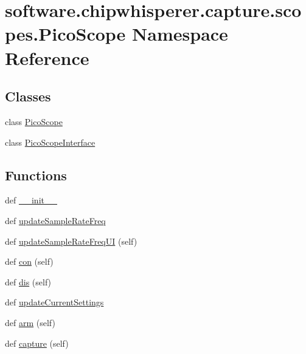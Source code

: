 \hypertarget{namespacesoftware_1_1chipwhisperer_1_1capture_1_1scopes_1_1PicoScope}{}\section{software.\+chipwhisperer.\+capture.\+scopes.\+Pico\+Scope Namespace Reference}
\label{namespacesoftware_1_1chipwhisperer_1_1capture_1_1scopes_1_1PicoScope}
\subsection*{Classes}
\begin{DoxyCompactItemize}
\item 
class \hyperlink{classsoftware_1_1chipwhisperer_1_1capture_1_1scopes_1_1PicoScope_1_1PicoScope}{Pico\+Scope}
\item 
class \hyperlink{classsoftware_1_1chipwhisperer_1_1capture_1_1scopes_1_1PicoScope_1_1PicoScopeInterface}{Pico\+Scope\+Interface}
\end{DoxyCompactItemize}
\subsection*{Functions}
\begin{DoxyCompactItemize}
\item 
def \hyperlink{namespacesoftware_1_1chipwhisperer_1_1capture_1_1scopes_1_1PicoScope_aede6bc8094789e7a9abfcfee603d9b4b}{\+\_\+\+\_\+init\+\_\+\+\_\+}
\item 
def \hyperlink{namespacesoftware_1_1chipwhisperer_1_1capture_1_1scopes_1_1PicoScope_abd05c556af1f41b561abfb0604c17458}{update\+Sample\+Rate\+Freq}
\item 
def \hyperlink{namespacesoftware_1_1chipwhisperer_1_1capture_1_1scopes_1_1PicoScope_a387dc036eac5d58fcf4d69e8dd3782bd}{update\+Sample\+Rate\+Freq\+U\+I} (self)
\item 
def \hyperlink{namespacesoftware_1_1chipwhisperer_1_1capture_1_1scopes_1_1PicoScope_abda082a236e19064566ae87b069d0f67}{con} (self)
\item 
def \hyperlink{namespacesoftware_1_1chipwhisperer_1_1capture_1_1scopes_1_1PicoScope_a6dcdf3772e023e33e09f655fd20aaaed}{dis} (self)
\item 
def \hyperlink{namespacesoftware_1_1chipwhisperer_1_1capture_1_1scopes_1_1PicoScope_a4f7d1e34961e416ee8aa74ce7809dbea}{update\+Current\+Settings}
\item 
def \hyperlink{namespacesoftware_1_1chipwhisperer_1_1capture_1_1scopes_1_1PicoScope_a30f8ebc4175d5b339ed8482eadc23a31}{arm} (self)
\item 
def \hyperlink{namespacesoftware_1_1chipwhisperer_1_1capture_1_1scopes_1_1PicoScope_a40e1a05746b56eec869864779cc23153}{capture} (self)
\end{DoxyCompactItemize}
